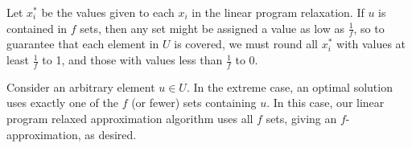 \documentclass[11pt]{article}
\begin{document}
Let $x_i^*$ be the values given to each $x_i$ in the linear program relaxation.
If $u$ is contained in $f$ sets, then any set might be assigned a value as low as $\frac{1}{f}$, so to guarantee that each element in $U$ is covered, we must round all $x_i^*$ with values at least $\frac{1}{f}$ to 1, and those with values less than $\frac{1}{f}$ to 0.

Consider an arbitrary element $u \in U$.
In the extreme case, an optimal solution uses exactly one of the $f$ (or fewer) sets containing $u$.
In this case, our linear program relaxed approximation algorithm uses all $f$ sets, giving an $f$-approximation, as desired.
\end{document}
